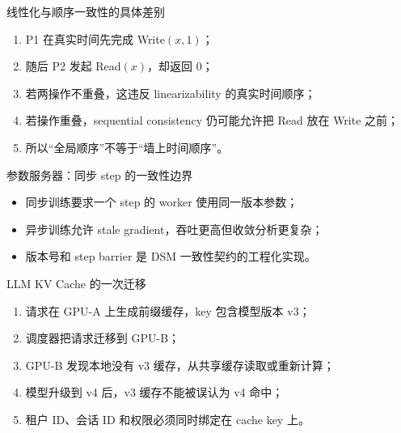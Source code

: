 \documentclass[UTF8,fontset=none,aspectratio=169,10pt]{beamer}
\begin{document}
\begin{frame}{线性化与顺序一致性的具体差别}
\begin{enumerate}
  \item P1 在真实时间先完成 Write$(x,1)$；
  \item 随后 P2 发起 Read$(x)$，却返回 0；
  \item 若两操作不重叠，这违反 linearizability 的真实时间顺序；
  \item 若操作重叠，sequential consistency 仍可能允许把 Read 放在 Write 之前；
  \item 所以“全局顺序”不等于“墙上时间顺序”。
\end{enumerate}
\end{frame}

\begin{frame}{参数服务器：同步 step 的一致性边界}
\begin{center}
\end{center}
\begin{itemize}
  \item 同步训练要求一个 step 的 worker 使用同一版本参数；
  \item 异步训练允许 stale gradient，吞吐更高但收敛分析更复杂；
  \item 版本号和 step barrier 是 DSM 一致性契约的工程化实现。
\end{itemize}
\end{frame}

\begin{frame}{LLM KV Cache 的一次迁移}
\begin{enumerate}
  \item 请求在 GPU-A 上生成前缀缓存，key 包含模型版本 v3；
  \item 调度器把请求迁移到 GPU-B；
  \item GPU-B 发现本地没有 v3 缓存，从共享缓存读取或重新计算；
  \item 模型升级到 v4 后，v3 缓存不能被误认为 v4 命中；
  \item 租户 ID、会话 ID 和权限必须同时绑定在 cache key 上。
\end{enumerate}
\end{frame}
\end{document}
